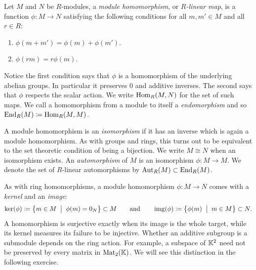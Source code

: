 \documentclass[Notebook.tex]{subfiles}
\begin{document}
Let $M$ and $N$ be $R$-modules, a \emph{module homomorphism}, or \emph{$R$-linear map}, is a function $\phi:M\to N$ satisfying the following conditions for all $m,m'\in M$ and all $r\in R$:
\begin{enumerate}[label=(\roman*)]
	\item $\phi(m+m')=\phi(m)+\phi(m')$.
	\item $\phi(rm)=r\phi(m)$.
\end{enumerate}
Notice the first condition says that $\phi$ is a homomorphism of the underlying abelian groups. In particular it preserves $0$ and additive inverses. The second says that $\phi$ respects the scalar action. We write $\operatorname{Hom}_R(M,N)$ for the set of such maps. We call a homomorphism from a module to itself a \emph{endomorphism} and so $\operatorname{End}_{R}(M) \coloneqq \operatorname{Hom}_{R}(M,M)$.

A module homomorphism is an \emph{isomorphism} if it has an inverse which is again a module homomorphism. As with groups and rings, this turns out to be equivalent to the set theoretic condition of being a bijection. We write $M\cong N$ when an isomorphism exists. An \emph{automorphism} of $M$ is an isomorphism $\phi:M \to M$. We denote the set of $R$-linear automorphisms by $\operatorname{Aut}_{R}(M) \subset \operatorname{End}_{R}(M)$.

As with ring homomorphisms, a module homomorphism $\phi:M\to N$ comes with a \emph{kernel} and an \emph{image}:
\[
\ker(\phi) \coloneqq \left\{ m \in M \;\; \big| \;\; \phi(m) = 0_N \right\}\subset M \qquad \text{and} \qquad \operatorname{img}(\phi) \coloneqq \left\{\phi(m) \;\; \big| \;\; m \in M\right\} \subset N.
\]
A homomorphism is surjective exactly when its image is the whole target, while its kernel measures its failure to be injective. Whether an additive subgroup is a submodule depends on the ring action. For example, a subspace of $\mathbb K^2$ need not be preserved by every matrix in $\operatorname{Mat}_2(\mathbb K)$. We will see this distinction in the following exercise.

\hrulefill
\end{document}
